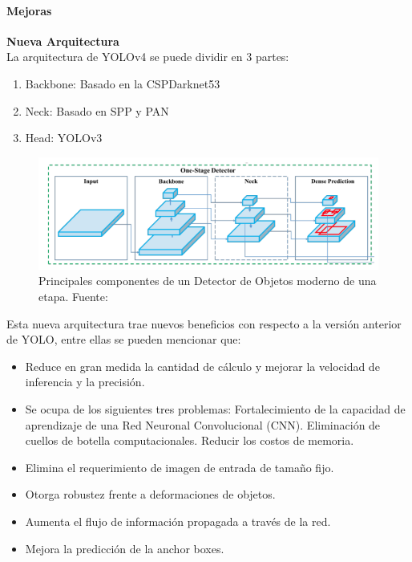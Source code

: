 \paragraph{Mejoras}

\textbf{Nueva Arquitectura} \\

La arquitectura de YOLOv4 se puede dividir en 3 partes:
\begin{enumerate}
    \item {Backbone: Basado en la CSPDarknet53}
    \item {Neck: Basado en SPP y PAN}
    \item {Head: YOLOv3}
\end{enumerate}

\begin{figure}
    \centering
    \includegraphics[width=1\textwidth]{img/ObjectDetectionArqui.png}
    \caption{Principales componentes de un Detector de Objetos moderno de una etapa. Fuente: \cite{yolov4}}
    \label{fig:object-detection-arqui}
\end{figure}

Esta nueva arquitectura trae nuevos beneficios con respecto a la versión anterior de YOLO, entre ellas se pueden mencionar que: 
\begin{itemize}
    \item Reduce en gran medida la cantidad de cálculo y mejorar la velocidad de inferencia y la precisión.
    \item Se ocupa de los siguientes tres problemas: Fortalecimiento de la capacidad de aprendizaje de una Red Neuronal Convolucional (CNN).
    Eliminación de cuellos de botella computacionales.
    Reducir los costos de memoria.
    \item Elimina el requerimiento de imagen de entrada de tamaño fijo.
    \item Otorga robustez frente a deformaciones de objetos.
    \item Aumenta el flujo de información propagada a través de la red.
    \item Mejora la predicción de la anchor boxes.
\end{itemize}
\hfill \break

